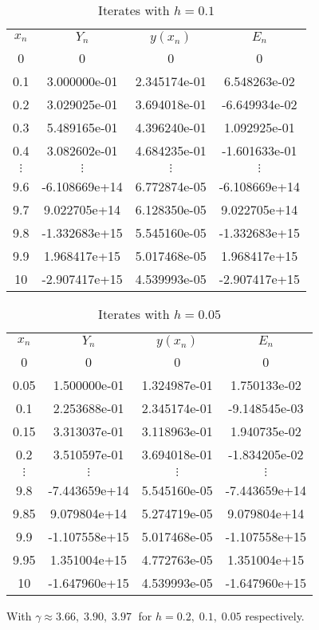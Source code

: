 \documentclass[14pt]{extarticle}
\begin{document}
\begin{table}[h!]
\caption{Iterates with $h=0.1$}
\centering
\begin{tabular}{cccc}
\\
\textbf{$x_n$} & \textbf{$Y_n$} & $y(x_n)$ & $E_n$ \\ [0.5ex]
0    &    0            &    0            &    0            \\ 
0.1  &    3.000000e-01 &    2.345174e-01 &    6.548263e-02 \\ 
0.2  &    3.029025e-01 &    3.694018e-01 &   -6.649934e-02 \\ 
0.3  &    5.489165e-01 &    4.396240e-01 &    1.092925e-01 \\ 
0.4  &    3.082602e-01 &    4.684235e-01 &   -1.601633e-01 \\ 
$\vdots$ & $\vdots$ & $\vdots$ & $\vdots$ \\
9.6  &   -6.108669e+14 &    6.772874e-05 &   -6.108669e+14 \\ 
9.7  &    9.022705e+14 &    6.128350e-05 &    9.022705e+14 \\ 
9.8  &   -1.332683e+15 &    5.545160e-05 &   -1.332683e+15 \\ 
9.9  &    1.968417e+15 &    5.017468e-05 &    1.968417e+15 \\ 
 10  &   -2.907417e+15 &    4.539993e-05 &   -2.907417e+15 \\ 
\end{tabular}
\label{table:3}
\end{table}

\pagebreak

\begin{table}[h!]
\caption{Iterates with $h=0.05$}
\centering
\begin{tabular}{cccc}
\\
\textbf{$x_n$} & \textbf{$Y_n$} & $y(x_n)$ & $E_n$ \\ [0.5ex]
0    &    0            &    0            &    0            \\ 
0.05 &    1.500000e-01 &    1.324987e-01 &    1.750133e-02 \\ 
0.1  &    2.253688e-01 &    2.345174e-01 &   -9.148545e-03 \\ 
0.15 &    3.313037e-01 &    3.118963e-01 &    1.940735e-02 \\ 
0.2  &    3.510597e-01 &    3.694018e-01 &   -1.834205e-02 \\ 
$\vdots$ & $\vdots$ & $\vdots$ & $\vdots$ \\
9.8   &   -7.443659e+14 &    5.545160e-05 &   -7.443659e+14 \\ 
9.85  &    9.079804e+14 &    5.274719e-05 &    9.079804e+14 \\ 
9.9   &   -1.107558e+15 &    5.017468e-05 &   -1.107558e+15 \\ 
9.95  &    1.351004e+15 &    4.772763e-05 &    1.351004e+15 \\ 
 10   &   -1.647960e+15 &    4.539993e-05 &   -1.647960e+15 \\ 
\end{tabular}
\label{table:4}
\end{table}
\noindent With $\gamma \approx 3.66,\;3.90,\;3.97\; $ for $h=0.2,\;0.1,\;0.05$ respectively.\\
\end{document}
